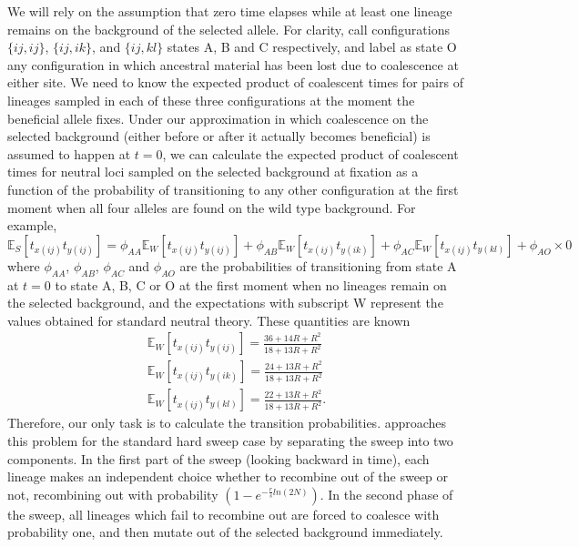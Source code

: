 \documentclass[a4paper,10pt]{article}
\begin{document}
We will rely on the assumption that zero time elapses while at least one lineage remains on the background of the selected allele. For clarity, call configurations $\{ij,ij\}$, $\{ij,ik\}$, and $\{ij,kl\}$ states A, B and C respectively, and label as state O any configuration in which ancestral material has been lost due to coalescence at either site. We need to know the expected product of coalescent times for pairs of lineages sampled in each of these three configurations at the moment the beneficial allele fixes. Under our approximation in which coalescence on the selected background (either before or after it actually becomes beneficial) is assumed to happen at $t = 0$, we can calculate the expected product of coalescent times for neutral loci sampled on the selected background at fixation as a function of the probability of transitioning to any other configuration at the first moment when all four alleles are found on the wild type background. For example,
\begin{equation}
	\mathbb{E}_S\left[t_{x\left(ij\right)}t_{y\left(ij\right)}\right] = \phi_{AA}\mathbb{E}_W\left[t_{x\left(ij\right)}t_{y\left(ij\right)}\right] + \phi_{AB}\mathbb{E}_W\left[t_{x\left(ij\right)}t_{y\left(ik\right)}\right] + \phi_{AC}\mathbb{E}_W\left[t_{x\left(ij\right)}t_{y\left(kl\right)}\right] + \phi_{AO}\times 0
\end{equation}
where $\phi_{AA}$, $\phi_{AB}$, $\phi_{AC}$ and $\phi_{AO}$ are the probabilities of transitioning from state A at $t = 0$ to state A, B, C or O at the first moment when no lineages remain on the selected background, and the expectations with subscript W represent the values obtained for standard neutral theory. These quantities are known 
\begin{align}
	\mathbb{E}_W\left[t_{x\left(ij\right)}t_{y\left(ij\right)}\right] = \frac{36 + 14R +R^2}{18 + 13R + R^2} \\
	\mathbb{E}_W\left[t_{x\left(ij\right)}t_{y\left(ik\right)}\right] = \frac{24 + 13R +R^2}{18 + 13R + R^2} \\
	\mathbb{E}_W\left[t_{x\left(ij\right)}t_{y\left(kl\right)}\right] = \frac{22 + 13R +R^2}{18 + 13R + R^2}.	
\end{align}
Therefore, our only task is to calculate the transition probabilities. \cite{McVean:2006ke} approaches this problem for the standard hard sweep case by separating the sweep into two components. In the first part of the sweep (looking backward in time), each lineage makes an independent choice whether to recombine out of the sweep or not, recombining out with probability $(1 - e^{-\frac{r}{s}ln(2N)})$. In the second phase of the sweep, all lineages which fail to recombine out are forced to coalesce with probability one, and then mutate out of the selected background immediately.
\end{document}
